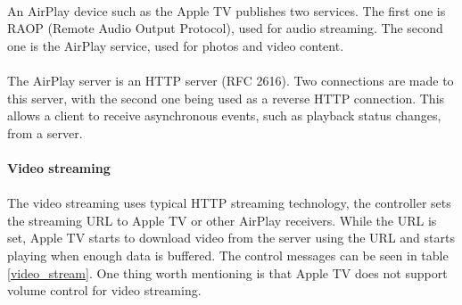 \\
An AirPlay device such as the Apple TV publishes two services. The first one is 
RAOP (Remote Audio Output Protocol), used for audio streaming. The second 
one is the AirPlay service, used for photos and video content. \\
\\
The AirPlay server is an HTTP server (RFC 2616). Two connections are made to this 
server, with the second one being used as a reverse HTTP connection. This allows a 
client to receive asynchronous events, such as playback status changes, from a 
server. \\
\\
\textbf{Video streaming} \\
\\ 
The video streaming uses typical HTTP streaming technology, the controller sets 
the streaming URL to Apple TV or other AirPlay receivers. While the URL is set, 
Apple TV starts to download video from the server using the URL and starts 
playing when enough data is buffered. The control messages can be seen in 
table \ref{video_stream}. One thing worth mentioning is that Apple TV does
not support volume control for video streaming.\\
\begin{table}[htb] 
\caption{AirPlay Video Control HTTP requests \label{video_stream}} 
\begin{center} 
\end{center} 
\end{table} 
